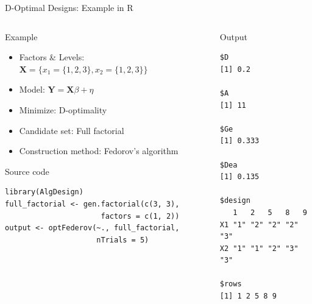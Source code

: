 \documentclass[10pt, compress, aspectratio=169, xcolor={table,usenames,dvipsnames}]{beamer}
\begin{document}
\begin{frame}[fragile,label={sec:org32c7094}]{D-Optimal Designs: Example in R}
 \begin{columns}
\begin{column}{0.5\columnwidth}
\begin{block}{Example}
\begin{itemize}
\item Factors \& Levels: \(\mathbf{X} = \{x_1 = \{1, 2, 3\}, x_2 = \{1, 2, 3\}\}\)
\item Model: \(\mathbf{Y} = \mathbf{X}\beta + \eta\)
\item Minimize: \alert{D-optimality}
\item Candidate set: \alert{Full factorial}
\item Construction method: \alert{Fedorov's algorithm}
\end{itemize}

\begin{block}{Source code}
\lstset{language=r,label= ,caption= ,captionpos=b,numbers=none}
\begin{lstlisting}
library(AlgDesign)
full_factorial <- gen.factorial(c(3, 3),
                      factors = c(1, 2))
output <- optFederov(~., full_factorial,
                     nTrials = 5)
\end{lstlisting}
\end{block}
\end{block}
\end{column}

\begin{column}{0.5\columnwidth}
\begin{block}{Output}
\scriptsize

\begin{verbatim}
$D
[1] 0.2

$A
[1] 11

$Ge
[1] 0.333

$Dea
[1] 0.135

$design
   1   2   5   8   9
X1 "1" "2" "2" "2" "3"
X2 "1" "1" "2" "3" "3"

$rows
[1] 1 2 5 8 9
\end{verbatim}

\normalsize
\end{block}
\end{column}
\end{columns}
\end{frame}
\end{document}
